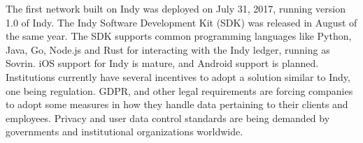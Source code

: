 The first network built on Indy was deployed on July 31, 2017, running version
1.0 of Indy. The Indy Software Development Kit (SDK) was released in August of
the same year. The SDK supports common programming languages like Python, Java,
Go, Node.js and Rust for interacting with the Indy ledger, running as Sovrin.
iOS support for Indy is mature, and Android support is planned. Institutions
currently have several incentives to adopt a solution similar to Indy, one
being regulation. GDPR, and other legal requirements are forcing companies to
adopt some measures in how they handle data pertaining to their clients and
employees. Privacy and user data control standards are being demanded by
governments and institutional organizations worldwide.
